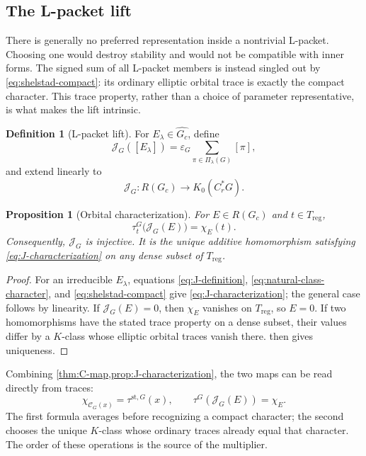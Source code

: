 \documentclass[11pt]{amsart}
\newtheorem{proposition}[theorem]{Proposition}
\theoremstyle{definition}
\newtheorem{definition}[theorem]{Definition}
\theoremstyle{remark}
\newcommand{\Cr}{C_r^*}
\newcommand{\reg}{\mathrm{reg}}
\begin{document}
\subsection{The L-packet lift}

There is generally no preferred representation inside a nontrivial L-packet.
Choosing one would destroy stability and would not be compatible with inner
forms.  The signed sum of all L-packet members is instead singled out by
\eqref{eq:shelstad-compact}: its ordinary elliptic orbital trace is exactly the
compact character.  This trace property, rather than a choice of parameter
representative, is what makes the lift intrinsic.

\begin{definition}[L-packet lift]\label{def:J-map}
For $E_\lambda\in\widehat{G_c}$, define
\begin{equation}\label{eq:J-definition}
  \mathcal J_G([E_\lambda])
  =\varepsilon_G\sum_{\pi\in\Pi_\lambda(G)}[\pi],
\end{equation}
and extend linearly to
\[
  \mathcal J_G:R(G_c)\longrightarrow K_0(\Cr G).
\]
\end{definition}

\begin{proposition}[Orbital characterization]\label{prop:J-characterization}
For $E\in R(G_c)$ and $t\in T_{\reg}$,
\begin{equation}\label{eq:J-characterization}
  \tau_t^G\bigl(\mathcal J_G(E)\bigr)=\chi_E(t).
\end{equation}
Consequently, $\mathcal J_G$ is injective.  It is the unique additive homomorphism satisfying \eqref{eq:J-characterization} on any dense subset of $T_{\reg}$.
\end{proposition}

\begin{proof}
For an irreducible $E_\lambda$, equations \eqref{eq:J-definition}, \eqref{eq:natural-class-character}, and \eqref{eq:shelstad-compact} give \eqref{eq:J-characterization}; the general case follows by linearity.  If $\mathcal J_G(E)=0$, then $\chi_E$ vanishes on $T_{\reg}$, so $E=0$.  If two homomorphisms have the stated trace property on a dense subset, their values differ by a $K$-class whose elliptic orbital traces vanish there.   then gives uniqueness.
\end{proof}

Combining \cref{thm:C-map,prop:J-characterization}, the two maps can be read directly from traces:
\[
  \chi_{\mathcal C_G(x)}=\tau^{\mathrm{st},G}(x),
  \qquad
  \tau^G(\mathcal J_G(E))=\chi_E.
\]
The first formula averages before recognizing a compact character; the second
chooses the unique \(K\)-class whose ordinary traces already equal that
character.  The order of these operations is the source of the multiplier.
\end{document}
